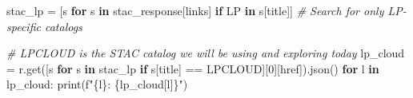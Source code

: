 \documentclass[
  letterpaper,
]{scrartcl}
\newenvironment{Shaded}{}{}
\newcommand{\BuiltInTok}[1]{#1}
\newcommand{\CommentTok}[1]{\textcolor[rgb]{0.38,0.63,0.69}{\textit{#1}}}
\newcommand{\ControlFlowTok}[1]{\textcolor[rgb]{0.00,0.44,0.13}{\textbf{#1}}}
\newcommand{\DecValTok}[1]{\textcolor[rgb]{0.25,0.63,0.44}{#1}}
\newcommand{\KeywordTok}[1]{\textcolor[rgb]{0.00,0.44,0.13}{\textbf{#1}}}
\newcommand{\NormalTok}[1]{#1}
\newcommand{\OperatorTok}[1]{\textcolor[rgb]{0.40,0.40,0.40}{#1}}
\newcommand{\SpecialCharTok}[1]{\textcolor[rgb]{0.25,0.44,0.63}{#1}}
\newcommand{\SpecialStringTok}[1]{\textcolor[rgb]{0.73,0.40,0.53}{#1}}
\newcommand{\StringTok}[1]{\textcolor[rgb]{0.25,0.44,0.63}{#1}}
\begin{document}
\begin{Shaded}
\begin{Highlighting}[]
\NormalTok{stac\_lp }\OperatorTok{=}\NormalTok{ [s }\ControlFlowTok{for}\NormalTok{ s }\KeywordTok{in}\NormalTok{ stac\_response[}\StringTok{\textquotesingle{}links\textquotesingle{}}\NormalTok{] }\ControlFlowTok{if} \StringTok{\textquotesingle{}LP\textquotesingle{}} \KeywordTok{in}\NormalTok{ s[}\StringTok{\textquotesingle{}title\textquotesingle{}}\NormalTok{]]  }\CommentTok{\# Search for only LP{-}specific catalogs}

\CommentTok{\# LPCLOUD is the STAC catalog we will be using and exploring today}
\NormalTok{lp\_cloud }\OperatorTok{=}\NormalTok{ r.get([s }\ControlFlowTok{for}\NormalTok{ s }\KeywordTok{in}\NormalTok{ stac\_lp }\ControlFlowTok{if}\NormalTok{ s[}\StringTok{\textquotesingle{}title\textquotesingle{}}\NormalTok{] }\OperatorTok{==} \StringTok{\textquotesingle{}LPCLOUD\textquotesingle{}}\NormalTok{][}\DecValTok{0}\NormalTok{][}\StringTok{\textquotesingle{}href\textquotesingle{}}\NormalTok{]).json()}
\ControlFlowTok{for}\NormalTok{ l }\KeywordTok{in}\NormalTok{ lp\_cloud: }\BuiltInTok{print}\NormalTok{(}\SpecialStringTok{f"}\SpecialCharTok{\{l\}}\SpecialStringTok{: }\SpecialCharTok{\{}\NormalTok{lp\_cloud[l]}\SpecialCharTok{\}}\SpecialStringTok{"}\NormalTok{)}
\end{Highlighting}
\end{Shaded}
\end{document}
